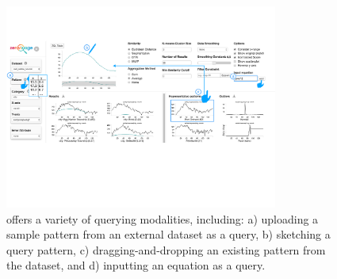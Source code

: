 \begin{figure}[h!]
\label{fig:modalities}
\centering
\includegraphics[width=0.8\textwidth]{figures/modalities.pdf}
\caption{\zv offers a variety of querying modalities, including: a) uploading a sample pattern from an external dataset as a query, b) sketching a query pattern, c) dragging-and-dropping an existing pattern from the dataset, and d) inputting an equation as a query.}
\end{figure}
